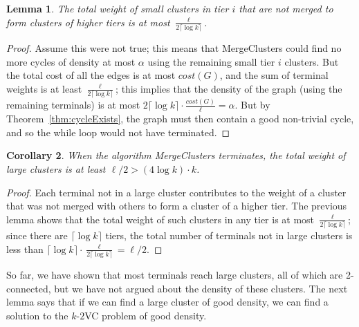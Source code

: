 \documentclass[11pt]{article}
\newtheorem{lemma}{Lemma}[section]
\newtheorem{corollary}[lemma]{Corollary}
\newcommand{\kvc}[1]{$k$-$#1${\sc VC} }
\newcommand{\kv}{\kvc{2}}
\newcommand{\ceil}[1]{\lceil #1 \rceil}
\begin{document}
\begin{lemma}\label{lem:fewLeftBehind}
  The total weight of small clusters in tier $i$ that are not merged to form
  clusters of higher tiers is at most $\frac{\ell}{2 \ceil{\log k}}$.
\end{lemma}
\begin{proof}
  Assume this were not true; this means that {\sc MergeClusters} could
  find no more cycles of density at most $\alpha$ using the remaining
  small tier $i$ clusters.  But the total cost of all the edges is at
  most $cost(G)$, and the sum of terminal weights is at least
  $\frac{\ell}{2 \ceil{\log k}}$; this implies that the density of the
  graph (using the remaining terminals) is at most $2 \ceil{\log k}
  \cdot \frac{cost(G)}{\ell} = \alpha$. But by
  Theorem~\ref{thm:cycleExists}, the graph must then contain a good
  non-trivial cycle, and so the while loop would not have terminated.
\end{proof}

\begin{corollary}\label{cor:weightLargeClusters}
  When the algorithm {\sc MergeClusters} terminates, the total weight of large
  clusters is at least $\ell/2 > (4 \log k) \cdot k$.
\end{corollary}
\begin{proof}
  Each terminal not in a large cluster contributes to the weight of a
  cluster that was not merged with others to form a cluster of a
  higher tier. The previous lemma shows that the total weight of such
  clusters in any tier is at most $\frac{\ell} {2\ceil{\log k}}$;
  since there are $\ceil{\log k}$ tiers, the total number of terminals
  not in large clusters is less than $\ceil{\log k} \cdot
  \frac{\ell}{2 \ceil{\log k}} = \ell/2$.
\end{proof}


So far, we have shown that most terminals reach large clusters, all of
which are 2-connected, but we have not argued about the density of
these clusters. The next lemma says that if we can find a large
cluster of good density, we can find a solution to the \kv problem of
good density.
\end{document}
